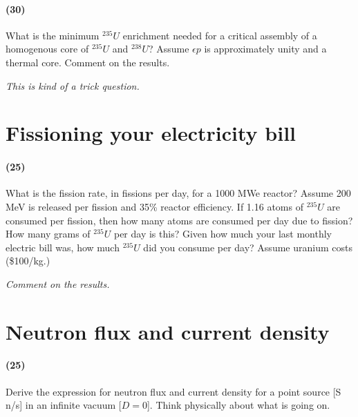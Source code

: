 \documentclass[11pt,a4paper]{article}
\begin{document}
\paragraph*{(30)}
What is the minimum $^{235}U$ enrichment needed for a critical assembly of a homogenous core of $^{235}U$ and $^{238}U$? Assume $\epsilon p$ is approximately unity and a thermal core. Comment on the results. 

\vspace{\baselineskip}

\noindent\textit{This is kind of a trick question.}





\newpage

\section{Fissioning your electricity bill}
\paragraph*{(25)}
What is the fission rate, in fissions per day, for a 1000 MWe reactor? Assume 200 MeV is released per fission and 35\% reactor efficiency. If 1.16 atoms of $^{235}U$ are consumed per fission, then how many atoms are consumed per day due to fission? How many grams of $^{235}U$ per day is this? Given how much your last monthly electric bill was, how much $^{235}U$ did you consume per day?  Assume uranium costs (\$100/kg.) 

\vspace{\baselineskip}

\noindent\textit{Comment on the results.}





\newpage

\section{Neutron flux and current density}
\paragraph*{(25)}
Derive the expression for neutron flux and current density for a point source [S n/s] in an infinite vacuum [$D = 0$]. Think physically about what is going on. 





\newpage
\end{document}
